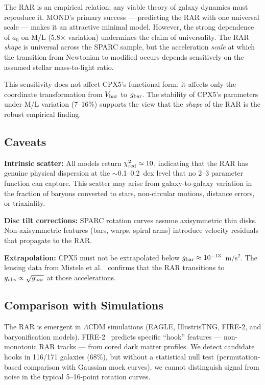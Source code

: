 \documentclass[twocolumn]{aastex631}
\begin{document}
The RAR is an empirical relation; any viable theory of galaxy dynamics
must reproduce it.  MOND's primary success --- predicting the RAR with
one universal scale --- makes it an attractive minimal model.  However,
the strong dependence of $a_0$ on M/L (5.8$\times$ variation) undermines
the claim of universality.  The RAR \emph{shape} is universal across the
SPARC sample, but the acceleration \emph{scale} at which the transition
from Newtonian to modified occurs depends sensitively on the assumed
stellar mass-to-light ratio.

This sensitivity does not affect CPX5's functional form; it affects only
the coordinate transformation from $V_{\rm bar}$ to $g_{\rm bar}$.  The
stability of CPX5's parameters under M/L variation (7--16\%) supports
the view that the \emph{shape} of the RAR is the robust empirical finding.

\subsection{Caveats}

\textbf{Intrinsic scatter:} All models return $\chi^2_{\rm red} \approx 10$,
indicating that the RAR has genuine physical dispersion at the
$\sim$0.1--0.2~dex level that no 2--3 parameter function can capture.
This scatter may arise from galaxy-to-galaxy variation in the fraction of
baryons converted to stars, non-circular motions, distance errors, or
triaxiality.

\textbf{Disc tilt corrections:} SPARC rotation curves assume axisymmetric
thin disks.  Non-axisymmetric features (bars, warps, spiral arms) introduce
velocity residuals that propagate to the RAR.

\textbf{Extrapolation:} CPX5 must not be extrapolated below $g_{\rm bar}
\approx 10^{-13}$~m/s$^2$.  The lensing data from Mistele et
al.~\cite{mistele2024} confirms that the RAR transitions to
$g_{\rm obs} \propto \sqrt{g_{\rm bar}}$ at those accelerations.

\subsection{Comparison with Simulations}

The RAR is emergent in $\Lambda$CDM simulations (EAGLE, IllustrisTNG,
FIRE-2, and baryonification models).  FIRE-2~\cite{ardizzone2023} predicts
specific ``hook'' features --- non-monotonic RAR tracks --- from cored
dark matter profiles.  We detect candidate hooks in 116/171 galaxies (68\%),
but without a statistical null test (permutation-based comparison with
Gaussian mock curves), we cannot distinguish signal from noise in the
typical 5--16-point rotation curves.
\end{document}
